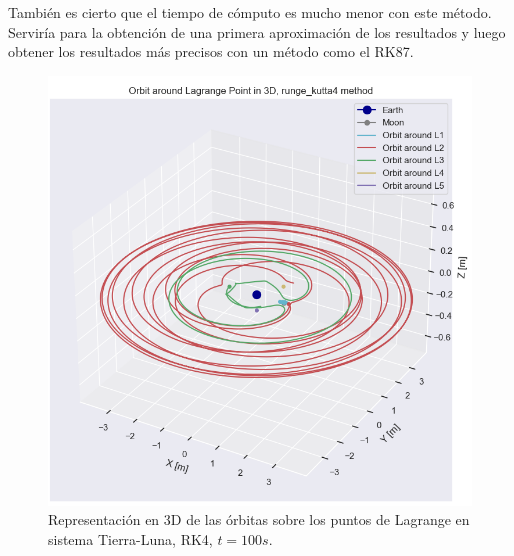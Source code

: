 \documentclass[12pt,a4paper]{article}
\begin{document}
También es cierto que el tiempo de cómputo es mucho menor con este método. Serviría para la obtención de una primera aproximación de los resultados y luego obtener los resultados más precisos con un método como el RK87.
\begin{figure}[H]
	\centering
	\includegraphics[width=\textwidth]{FIGURES/mil6/Lptos_orbit_rk4_t100.png}
	\caption{Representación en 3D de las órbitas sobre los puntos de Lagrange en sistema Tierra-Luna, RK4, $t = 100 s$.}
	\label{Lptos_orbit_rk4_t100}
\end{figure}
\end{document}
